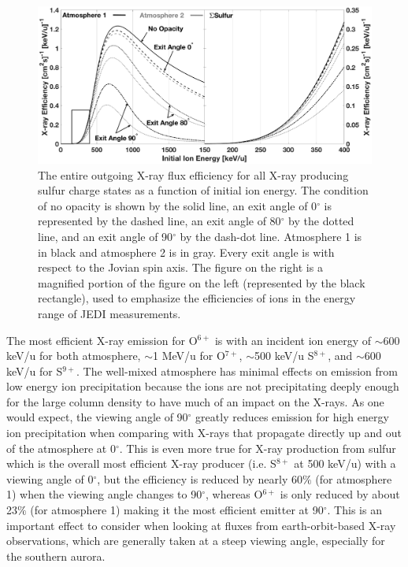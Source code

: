 \documentclass[draft]{agujournal2018}
\begin{document}
\begin{figure}[ht]
    \centering
    \includegraphics[width=\textwidth]{Figures/SulXrayEff2.eps}
    \caption{The entire outgoing X-ray flux efficiency for all X-ray producing sulfur charge states as a function of initial ion energy. The condition of no opacity is shown by the solid line, an exit angle of 0$^{\circ}$ is represented by the dashed line, an exit angle of 80$^{\circ}$ by the dotted line, and an exit angle of 90$^{\circ}$ by the dash-dot line. Atmosphere 1 is in black and atmosphere 2 is in gray. Every exit angle is with respect to the Jovian spin axis. The figure on the right is a magnified portion of the figure on the left (represented by the black rectangle), used to emphasize the efficiencies of ions in the energy range of JEDI measurements.}
    \label{fig:SulXrayEff}
\end{figure}

The most efficient X-ray emission for O$^{6+}$ is with an incident ion energy of $\sim$600 keV/u for both atmosphere, $\sim$1 MeV/u for O$^{7+}$, $\sim$500 keV/u S$^{8+}$, and $\sim$600 keV/u for S$^{9+}$.
The well-mixed atmosphere has minimal effects on emission from low energy ion precipitation because the ions are not precipitating deeply enough for the large column density to have much of an impact on the X-rays.
As one would expect, the viewing angle of 90$^{\circ}$ greatly reduces emission for high energy ion precipitation when comparing with X-rays that propagate directly up and out of the atmosphere at 0$^{\circ}$.
This is even more true for X-ray production from sulfur which is the overall most efficient X-ray producer (i.e. S$^{8+}$ at 500 keV/u) with a viewing angle of 0$^{\circ}$, but the efficiency is reduced by nearly 60$\%$ (for atmosphere 1) when the viewing angle changes to 90$^{\circ}$, whereas O$^{6+}$ is only reduced by about 23$\%$ (for atmosphere 1) making it the most efficient emitter at 90$^{\circ}$.
This is an important effect to consider when looking at fluxes from earth-orbit-based X-ray observations, which are generally taken at a steep viewing angle, especially for the southern aurora.
\end{document}
